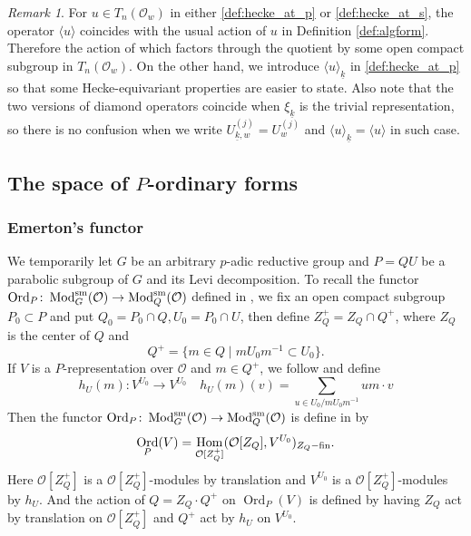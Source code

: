 \documentclass[leqno]{amsart}
\theoremstyle{definition}
\theoremstyle{remark}
\newtheorem{rem}[thm]{Remark}
\newcommand{\oo}{\mathcal{O}}
\DeclareMathOperator{\Hom}{Hom}
\DeclareMathOperator{\Mod}{\textnormal{Mod}}
\DeclareMathOperator{\Ord}{Ord} %
\newcommand{\sm}{\textnormal{sm}}
\newcommand{\wt}[1]{\underline{ #1 }}
\begin{document}
\begin{rem}
For $u\in T_n(\oo_w)$ in either 
\eqref{def:hecke_at_p} or \eqref{def:hecke_at_s},
the operator $\langle u\rangle$
coincides with the usual action of $u$ in
Definition \ref{def:algform}.
Therefore the action of which
factors through the quotient by some 
open compact subgroup in $T_n(\oo_w)$.
On the other hand, 
we introduce $\langle u\rangle_{\wt{k}}$
in \eqref{def:hecke_at_p}
so that some Hecke-equivariant properties
are easier to state.
Also note that the two versions of diamond operators
coincide when $\xi_{\wt{k}}$ is the trivial representation,
so there is no confusion when we write
$U_{\wt{k},w}^{(j)}=U_{w}^{(j)}$ and 
$\langle u\rangle_{\wt{k}}=\langle u\rangle$ in such case.
\end{rem}





\subsection{The space of $P$-ordinary forms}



\subsubsection{Emerton's functor}

We temporarily let $G$ be an arbitrary $p$-adic reductive group
and $P=QU$ be a parabolic subgroup of $G$ and its Levi decomposition.
To recall the functor 
$\Ord_P\colon \Mod_G^{\sm}(\oo)\to \Mod_Q^{\sm}(\oo)$
defined in \cite{emeI},
we fix an open compact subgroup $P_0\subset P$
and put $Q_0=P_0\cap Q, U_0=P_0\cap U$,
then define $Z_Q^+=Z_Q\cap Q^+$,
where $Z_Q$ is the center of $Q$ and
\[
	Q^+=\{m\in Q\mid mU_0m^{-1}\subset U_0\}.
\]
If  $V$ is a $P$-representation over $\oo$
and  $m\in Q^+$,
we follow \cite[Def 3.1.3]{emeI} and define
\begin{equation}\label{def:hUm}
	 h_{U}(m)\colon V^{U_0}\to V^{U_0}\quad
	 h_{U}(m)(v)=\sum_{u\in U_0/m U_0 m^{-1}}um\cdot v
\end{equation}
Then the functor
$\Ord_P\colon \Mod_G^{\sm}(\oo)\to \Mod_Q^{\sm}(\oo)$
is define in \cite[Def 3.1.3]{emeI} by
\begin{equation}\label{def:OrdP}
	\Ord_P(V)=\Hom_{\oo[Z_Q^+]}
    (\oo[Z_Q], V^{U_0})_{Z_Q-\textnormal{fin}}.
\end{equation}
Here $\oo[Z_Q^+]$ is a $\oo[Z_Q^+]$-modules by translation
and $V^{U_0}$ is a $\oo[Z_Q^+]$-modules by $h_U$.
And the action of $Q=Z_Q\cdot Q^+$ on $\Ord_P(V)$ is defined by 
having $Z_Q$ act by translation on $\oo[Z_Q^+]$ and 
$Q^+$ act by $h_U$ on $V^{U_0}$.
\end{document}
